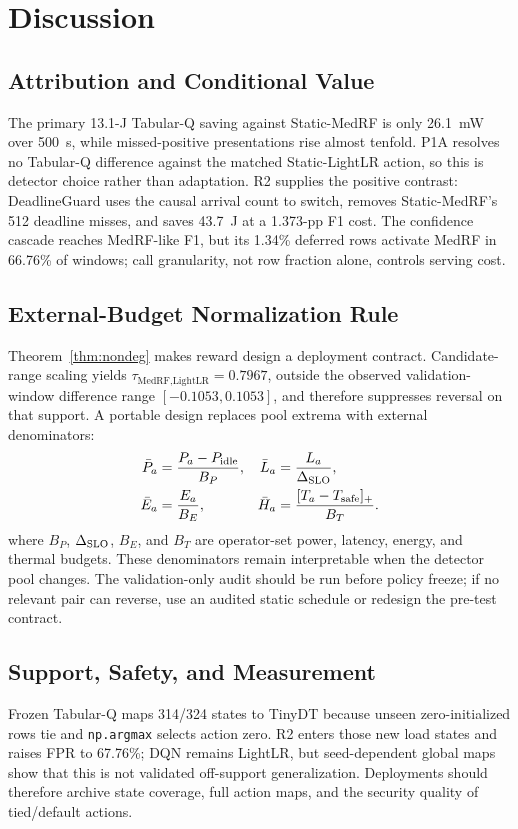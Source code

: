 \section{Discussion}
\label{sec:discuss}
\subsection{Attribution and Conditional Value}
The primary 13.1-J Tabular-Q saving against Static-MedRF is only 26.1~mW over 500~s, while missed-positive presentations rise almost tenfold. P1A resolves no Tabular-Q difference against the matched Static-LightLR action, so this is detector choice rather than adaptation. R2 supplies the positive contrast: DeadlineGuard uses the causal arrival count to switch, removes Static-MedRF's 512 deadline misses, and saves 43.7~J at a 1.373-pp F1 cost. The confidence cascade reaches MedRF-like F1, but its 1.34\% deferred rows activate MedRF in 66.76\% of windows; call granularity, not row fraction alone, controls serving cost.

\subsection{External-Budget Normalization Rule}
Theorem~\ref{thm:nondeg} makes reward design a deployment contract. Candidate-range scaling yields $\tau_{\text{MedRF,LightLR}}=0.7967$, outside the observed validation-window difference range $[-0.1053,0.1053]$, and therefore suppresses reversal on that support. A portable design replaces pool extrema with external denominators:
\begin{align}
\bar P_a&=\frac{P_a-P_{\rm idle}}{B_P}, &
\bar L_a&=\frac{L_a}{\Delta_{\rm SLO}},\\
\bar E_a&=\frac{E_a}{B_E}, &
\bar H_a&=\frac{[T_a-T_{\rm safe}]_+}{B_T}.
\end{align}
where $B_P$, $\Delta_{\rm SLO}$, $B_E$, and $B_T$ are operator-set power, latency, energy, and thermal budgets. These denominators remain interpretable when the detector pool changes. The validation-only audit should be run before policy freeze; if no relevant pair can reverse, use an audited static schedule or redesign the pre-test contract.

\subsection{Support, Safety, and Measurement}
Frozen Tabular-Q maps 314/324 states to TinyDT because unseen zero-initialized rows tie and \texttt{np.argmax} selects action zero. R2 enters those new load states and raises FPR to 67.76\%; DQN remains LightLR, but seed-dependent global maps show that this is not validated off-support generalization. Deployments should therefore archive state coverage, full action maps, and the security quality of tied/default actions.

